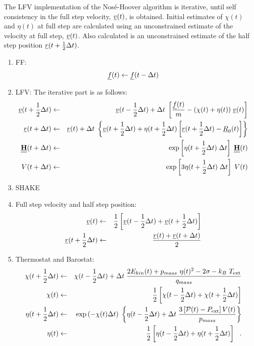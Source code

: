 The LFV implementation of the Nos\'{e}-Hoover algorithm is iterative,
until self consistency in the full step velocity, $\mbox{$\underline{v}$}(t)$,
is obtained.  Initial estimates of $\chi (t)$ and $\eta (t)$ at
full step are calculated using an unconstrained estimate of the
velocity at full step, $\mbox{$\underline{v}$}(t)$.  Also calculated is an unconstrained
estimate of the half step position $\mbox{$\underline{r}$}(t + {1 \over 2} \Delta t)$.
\begin{enumerate}
\item FF:
\begin{equation}
\mbox{$\underline{f}$}(t) \leftarrow \mbox{$\underline{f}$}(t - \Delta t)
\end{equation}
\item LFV: The iterative part is as follows:
\begin{eqnarray}
\mbox{$\underline{v}$}(t + {1 \over 2} \Delta t) &\leftarrow& \mbox{$\underline{v}$}(t - {1 \over 2} \Delta t) + \Delta t \;
\left[{\mbox{$\underline{f}$}(t) \over m} - (\chi (t) + \eta (t)) \; \mbox{$\underline{v}$}(t) \right] \nonumber \\
\mbox{$\underline{r}$}(t + \Delta t) &\leftarrow& \mbox{$\underline{r}$}(t) + \Delta t \;
\left\{ \mbox{$\underline{v}$}(t + {1 \over 2} \Delta t) + \eta (t + {1 \over 2} \Delta t) \left[
\mbox{$\underline{r}$}(t + {1 \over 2} \Delta t) - \mbox{$\underline{R}$}_{0}(t) \right] \right\} \nonumber \\
\mbox{$\underline{\underline{\bf H}}$}(t + \Delta t) &\leftarrow& \exp \left[ \eta (t + {1 \over 2} \Delta t) \;
\Delta t \right] \; \mbox{$\underline{\underline{\bf H}}$}(t) \\
V(t + \Delta t) &\leftarrow& \exp \left[3 \eta (t + {1 \over 2} \Delta t) \;
\Delta t \right] \; V(t) \nonumber
\end{eqnarray}
\item SHAKE \item Full step velocity and half step position:
\begin{eqnarray}
\mbox{$\underline{v}$}(t) &\leftarrow& {1 \over 2} \left[ \mbox{$\underline{v}$}(t - {1 \over 2} \Delta t) +
\mbox{$\underline{v}$}(t + {1 \over 2} \Delta t) \right] \nonumber \\
\mbox{$\underline{r}$}(t + {1 \over 2} \Delta t) &\leftarrow& \frac{\mbox{$\underline{r}$}(t) + \mbox{$\underline{r}$}(t + \Delta t)}{2}
\end{eqnarray}
\item Thermostat and Barostat:
\begin{eqnarray}
\chi (t + {1 \over 2} \Delta t) &\leftarrow& \chi (t - {1 \over 2} \Delta t) + \Delta t \;
{{2 E_{kin}(t) + p_{mass}~\eta (t)^{2} - 2 \sigma - k_{B}~T_{\rm ext}} \over q_{mass}} \nonumber \\
\chi (t) &\leftarrow& {1 \over 2} \left[ \chi (t - {1 \over 2} \Delta t) +
\chi (t + {1 \over 2} \Delta t) \right] \nonumber \\
\eta (t + {1 \over 2} \Delta t) &\leftarrow& \exp \left( -\chi (t) \Delta t \right) \;
\left\{ \eta (t - {1 \over 2} \Delta t) + \Delta t \;
{3 \left[ {\cal P}(t) - P_{\rm ext} \right] V(t) \over p_{mass}} \right\} \\
\eta (t) &\leftarrow& {1 \over 2} \left[ \eta (t - {1 \over 2} \Delta t) +
\eta (t + {1 \over 2} \Delta t) \right]~~. \nonumber
\end{eqnarray}
\end{enumerate}
